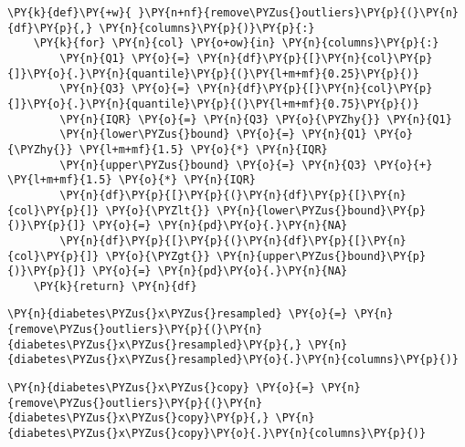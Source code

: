     \begin{tcolorbox}[breakable, size=fbox, boxrule=1pt, pad at break*=1mm,colback=cellbackground, colframe=cellborder]
\begin{Verbatim}[commandchars=\\\{\}]
\PY{k}{def}\PY{+w}{ }\PY{n+nf}{remove\PYZus{}outliers}\PY{p}{(}\PY{n}{df}\PY{p}{,} \PY{n}{columns}\PY{p}{)}\PY{p}{:}
    \PY{k}{for} \PY{n}{col} \PY{o+ow}{in} \PY{n}{columns}\PY{p}{:}
        \PY{n}{Q1} \PY{o}{=} \PY{n}{df}\PY{p}{[}\PY{n}{col}\PY{p}{]}\PY{o}{.}\PY{n}{quantile}\PY{p}{(}\PY{l+m+mf}{0.25}\PY{p}{)}
        \PY{n}{Q3} \PY{o}{=} \PY{n}{df}\PY{p}{[}\PY{n}{col}\PY{p}{]}\PY{o}{.}\PY{n}{quantile}\PY{p}{(}\PY{l+m+mf}{0.75}\PY{p}{)}
        \PY{n}{IQR} \PY{o}{=} \PY{n}{Q3} \PY{o}{\PYZhy{}} \PY{n}{Q1}
        \PY{n}{lower\PYZus{}bound} \PY{o}{=} \PY{n}{Q1} \PY{o}{\PYZhy{}} \PY{l+m+mf}{1.5} \PY{o}{*} \PY{n}{IQR}
        \PY{n}{upper\PYZus{}bound} \PY{o}{=} \PY{n}{Q3} \PY{o}{+} \PY{l+m+mf}{1.5} \PY{o}{*} \PY{n}{IQR}
        \PY{n}{df}\PY{p}{[}\PY{p}{(}\PY{n}{df}\PY{p}{[}\PY{n}{col}\PY{p}{]} \PY{o}{\PYZlt{}} \PY{n}{lower\PYZus{}bound}\PY{p}{)}\PY{p}{]} \PY{o}{=} \PY{n}{pd}\PY{o}{.}\PY{n}{NA}
        \PY{n}{df}\PY{p}{[}\PY{p}{(}\PY{n}{df}\PY{p}{[}\PY{n}{col}\PY{p}{]} \PY{o}{\PYZgt{}} \PY{n}{upper\PYZus{}bound}\PY{p}{)}\PY{p}{]} \PY{o}{=} \PY{n}{pd}\PY{o}{.}\PY{n}{NA}
    \PY{k}{return} \PY{n}{df}
\end{Verbatim}
\end{tcolorbox}

    \begin{tcolorbox}[breakable, size=fbox, boxrule=1pt, pad at break*=1mm,colback=cellbackground, colframe=cellborder]
\begin{Verbatim}[commandchars=\\\{\}]
\PY{n}{diabetes\PYZus{}x\PYZus{}resampled} \PY{o}{=} \PY{n}{remove\PYZus{}outliers}\PY{p}{(}\PY{n}{diabetes\PYZus{}x\PYZus{}resampled}\PY{p}{,} \PY{n}{diabetes\PYZus{}x\PYZus{}resampled}\PY{o}{.}\PY{n}{columns}\PY{p}{)}
\end{Verbatim}
\end{tcolorbox}

    \begin{tcolorbox}[breakable, size=fbox, boxrule=1pt, pad at break*=1mm,colback=cellbackground, colframe=cellborder]
\begin{Verbatim}[commandchars=\\\{\}]
\PY{n}{diabetes\PYZus{}x\PYZus{}copy} \PY{o}{=} \PY{n}{remove\PYZus{}outliers}\PY{p}{(}\PY{n}{diabetes\PYZus{}x\PYZus{}copy}\PY{p}{,} \PY{n}{diabetes\PYZus{}x\PYZus{}copy}\PY{o}{.}\PY{n}{columns}\PY{p}{)}
\end{Verbatim}
\end{tcolorbox}

